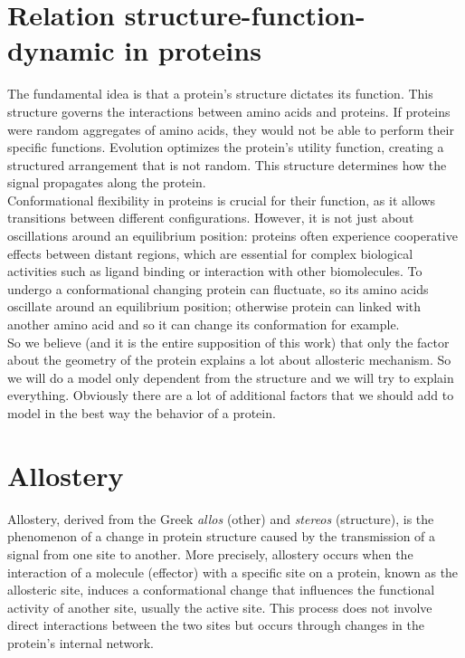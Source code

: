 \documentclass[English, Lau, oneside]{sapthesis}
\begin{document}
\section{Relation structure-function-dynamic in proteins}
\noindent The fundamental idea is that a protein's structure dictates its function. This structure governs the interactions between amino acids and proteins. If proteins were random aggregates of amino acids, they would not be able to perform their specific functions. Evolution optimizes the protein’s utility function, creating a structured arrangement that is not random.
This structure determines how the signal propagates along the protein.\\
Conformational flexibility in proteins is crucial for their function, as it allows transitions between different configurations. However, it is not just about oscillations around an equilibrium position: proteins often experience cooperative effects between distant regions, which are essential for complex biological activities such as ligand binding or interaction with other biomolecules.
To undergo a conformational changing protein can fluctuate, so its amino acids oscillate around an equilibrium position;
otherwise protein can linked with another amino acid and so it can change its conformation for example.\\
So we believe (and it is the entire supposition of this work) that only the factor about the geometry of the protein explains a lot about allosteric mechanism.
So we will do a model only dependent from the structure and we will try to explain everything. 
Obviously there are a lot of additional factors that we should add to model in the best way the behavior of a protein.\\

\newpage
\section{Allostery}

\noindent Allostery, derived from the Greek \textit{allos} (other) and \textit{stereos} (structure), is the phenomenon of a change in protein structure caused by the transmission of a signal from one site to another.\cite{ref5}  
More precisely, allostery occurs when the interaction of a molecule (effector) with a specific site on a protein, known as the allosteric site, induces a conformational change that influences the functional activity of another site, usually the active site. This process does not involve direct interactions between the two sites but occurs through changes in the protein’s internal network.
\end{document}
